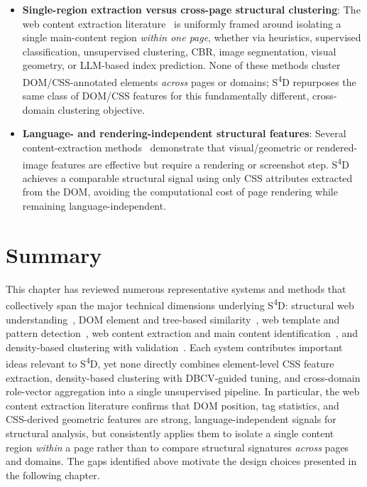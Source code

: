 \begin{itemize}
    \item \textbf{Single-region extraction versus cross-page structural clustering}: The web content extraction literature~\cite{alghuribi2013survey,gupta2011heuristic,joshi2009domnlp,utiu2018domfeatures,morbieu2020kernix,prasath2016cbr,singh2014regions,jung2021dontread,chen2025indexlm} is uniformly framed around isolating a single main-content region \emph{within one page}, whether via heuristics, supervised classification, unsupervised clustering, CBR, image segmentation, visual geometry, or LLM-based index prediction. None of these methods cluster DOM/CSS-annotated elements \emph{across} pages or domains; S\textsuperscript{4}D repurposes the same class of DOM/CSS features for this fundamentally different, cross-domain clustering objective.

    \item \textbf{Language- and rendering-independent structural features}: Several content-extraction methods~\cite{jung2021dontread,singh2014regions} demonstrate that visual/geometric or rendered-image features are effective but require a rendering or screenshot step. S\textsuperscript{4}D achieves a comparable structural signal using only CSS attributes extracted from the DOM, avoiding the computational cost of page rendering while remaining language-independent.
\end{itemize}

\section{Summary}
\label{sec:related-summary}

This chapter has reviewed numerous representative systems and methods that collectively span the major technical dimensions underlying S\textsuperscript{4}D: structural web understanding~\cite{chen2021websrc,deng2022domlm,hambley2023webstructure,huynh2023segmentation}, DOM element and tree-based similarity~\cite{grigera2022domflexible,brisset2022sftm,gulhane2011vertex}, web template and pattern detection~\cite{larroque2014template,lockard2020zeroshotceres}, web content extraction and main content identification~\cite{alghuribi2013survey,gupta2011heuristic,joshi2009domnlp,utiu2018domfeatures,morbieu2020kernix,prasath2016cbr,singh2014regions,jung2021dontread,chen2025indexlm}, and density-based clustering with validation~\cite{campello2015hdbscan,moulavi2014dbcv}. Each system contributes important ideas relevant to S\textsuperscript{4}D, yet none directly combines element-level CSS feature extraction, density-based clustering with DBCV-guided tuning, and cross-domain role-vector aggregation into a single unsupervised pipeline. In particular, the web content extraction literature confirms that DOM position, tag statistics, and CSS-derived geometric features are strong, language-independent signals for structural analysis, but consistently applies them to isolate a single content region \emph{within} a page rather than to compare structural signatures \emph{across} pages and domains. The gaps identified above motivate the design choices presented in the following chapter.
